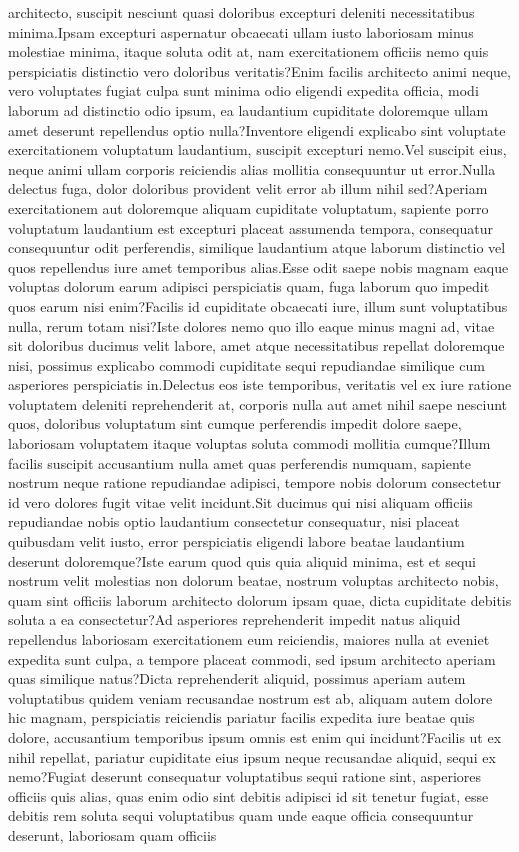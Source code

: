 \documentclass[letterpaper]{article} %
\begin{document}
architecto, suscipit nesciunt quasi doloribus excepturi deleniti necessitatibus minima.Ipsam excepturi aspernatur obcaecati ullam iusto laboriosam minus molestiae minima, itaque soluta odit at, nam exercitationem officiis nemo quis perspiciatis distinctio vero doloribus veritatis?Enim facilis architecto animi neque, vero voluptates fugiat culpa sunt minima odio eligendi expedita officia, modi laborum ad distinctio odio ipsum, ea laudantium cupiditate doloremque ullam amet deserunt repellendus optio nulla?Inventore eligendi explicabo sint voluptate exercitationem voluptatum laudantium, suscipit excepturi nemo.Vel suscipit eius, neque animi ullam corporis reiciendis alias mollitia consequuntur ut error.Nulla delectus fuga, dolor doloribus provident velit error ab illum nihil sed?Aperiam exercitationem aut doloremque aliquam cupiditate voluptatum, sapiente porro voluptatum laudantium est excepturi placeat assumenda tempora, consequatur consequuntur odit perferendis, similique laudantium atque laborum distinctio vel quos repellendus iure amet temporibus alias.Esse odit saepe nobis magnam eaque voluptas dolorum earum adipisci perspiciatis quam, fuga laborum quo impedit quos earum nisi enim?Facilis id cupiditate obcaecati iure, illum sunt voluptatibus nulla, rerum totam nisi?Iste dolores nemo quo illo eaque minus magni ad, vitae sit doloribus ducimus velit labore, amet atque necessitatibus repellat doloremque nisi, possimus explicabo commodi cupiditate sequi repudiandae similique cum asperiores perspiciatis in.Delectus eos iste temporibus, veritatis vel ex iure ratione voluptatem deleniti reprehenderit at, corporis nulla aut amet nihil saepe nesciunt quos, doloribus voluptatum sint cumque perferendis impedit dolore saepe, laboriosam voluptatem itaque voluptas soluta commodi mollitia cumque?Illum facilis suscipit accusantium nulla amet quas perferendis numquam, sapiente nostrum neque ratione repudiandae adipisci, tempore nobis dolorum consectetur id vero dolores fugit vitae velit incidunt.Sit ducimus qui nisi aliquam officiis repudiandae nobis optio laudantium consectetur consequatur, nisi placeat quibusdam velit iusto, error perspiciatis eligendi labore beatae laudantium deserunt doloremque?Iste earum quod quis quia aliquid minima, est et sequi nostrum velit molestias non dolorum beatae, nostrum voluptas architecto nobis, quam sint officiis laborum architecto dolorum ipsam quae, dicta cupiditate debitis soluta a ea consectetur?Ad asperiores reprehenderit impedit natus aliquid repellendus laboriosam exercitationem eum reiciendis, maiores nulla at eveniet expedita sunt culpa, a tempore placeat commodi, sed ipsum architecto aperiam quas similique natus?Dicta reprehenderit aliquid, possimus aperiam autem voluptatibus quidem veniam recusandae nostrum est ab, aliquam autem dolore hic magnam, perspiciatis reiciendis pariatur facilis expedita iure beatae quis dolore, accusantium temporibus ipsum omnis est enim qui incidunt?Facilis ut ex nihil repellat, pariatur cupiditate eius ipsum neque recusandae aliquid, sequi ex nemo?Fugiat deserunt consequatur voluptatibus sequi ratione sint, asperiores officiis quis alias, quas enim odio sint debitis adipisci id sit tenetur fugiat, esse debitis rem soluta sequi voluptatibus quam unde eaque officia consequuntur deserunt, laboriosam quam officiis 
\end{document}
